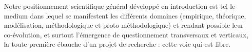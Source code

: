 Notre positionnement scientifique général développé en introduction est tel le medium dans lequel se manifestent les différents domaines (empirique, théorique, modélisation, méthodologique et proto-méthodologique) et rendant possible leur co-évolution, et surtout l'émergence de questionnement transversaux et verticaux, la toute première ébauche d'un projet de recherche : cette voie qui est libre.

\newpage







